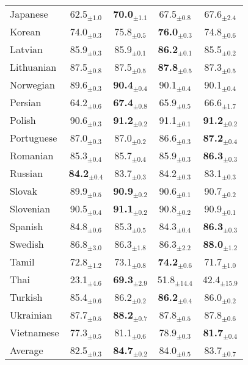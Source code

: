 \begin{table*}[ht]
{{\begin{tabular}{lcccc}
Japanese & 62.5$_{\pm 1.0}$ & \textbf{70.0}$_{\pm 1.1}$ & 67.5$_{\pm 0.8}$ & 67.6$_{\pm 2.4}$ \\
Korean & 74.0$_{\pm 0.3}$ & 75.8$_{\pm 0.5}$ & \textbf{76.0}$_{\pm 0.3}$ & 74.8$_{\pm 0.6}$ \\
Latvian & 85.9$_{\pm 0.3}$ & 85.9$_{\pm 0.1}$ & \textbf{86.2}$_{\pm 0.1}$ & 85.5$_{\pm 0.2}$ \\
Lithuanian & 87.5$_{\pm 0.8}$ & 87.5$_{\pm 0.5}$ & \textbf{87.8}$_{\pm 0.5}$ & 87.3$_{\pm 0.5}$ \\
Norwegian & 89.6$_{\pm 0.3}$ & \textbf{90.4}$_{\pm 0.4}$ & 90.1$_{\pm 0.4}$ & 90.1$_{\pm 0.4}$ \\
Persian & 64.2$_{\pm 0.6}$ & \textbf{67.4}$_{\pm 0.8}$ & 65.9$_{\pm 0.5}$ & 66.6$_{\pm 1.7}$ \\
Polish & 90.6$_{\pm 0.3}$ & \textbf{91.2}$_{\pm 0.2}$ & 91.1$_{\pm 0.1}$ & \textbf{91.2}$_{\pm 0.2}$ \\
Portuguese & 87.0$_{\pm 0.3}$ & 87.0$_{\pm 0.2}$ & 86.6$_{\pm 0.3}$ & \textbf{87.2}$_{\pm 0.4}$ \\
Romanian & 85.3$_{\pm 0.4}$ & 85.7$_{\pm 0.4}$ & 85.9$_{\pm 0.3}$ & \textbf{86.3}$_{\pm 0.3}$ \\
Russian & \textbf{84.2}$_{\pm 0.4}$ & 83.7$_{\pm 0.3}$ & 84.2$_{\pm 0.3}$ & 83.1$_{\pm 0.3}$ \\
Slovak & 89.9$_{\pm 0.5}$ & \textbf{90.9}$_{\pm 0.2}$ & 90.6$_{\pm 0.1}$ & 90.7$_{\pm 0.2}$ \\
Slovenian & 90.5$_{\pm 0.4}$ & \textbf{91.1}$_{\pm 0.2}$ & 90.8$_{\pm 0.2}$ & 90.9$_{\pm 0.1}$ \\
Spanish & 84.8$_{\pm 0.6}$ & 85.3$_{\pm 0.5}$ & 84.3$_{\pm 0.4}$ & \textbf{86.3}$_{\pm 0.3}$ \\
Swedish & 86.8$_{\pm 3.0}$ & 86.3$_{\pm 1.8}$ & 86.3$_{\pm 2.2}$ & \textbf{88.0}$_{\pm 1.2}$ \\
Tamil & 72.8$_{\pm 1.2}$ & 73.1$_{\pm 0.8}$ & \textbf{74.2}$_{\pm 0.6}$ & 71.7$_{\pm 1.0}$ \\
Thai & 23.1$_{\pm 4.6}$ & \textbf{69.3}$_{\pm 2.9}$ & 51.8$_{\pm 14.4}$ & 42.4$_{\pm 15.9}$ \\
Turkish & 85.4$_{\pm 0.6}$ & 86.2$_{\pm 0.2}$ & \textbf{86.2}$_{\pm 0.4}$ & 86.0$_{\pm 0.2}$ \\
Ukrainian & 87.7$_{\pm 0.5}$ & \textbf{88.2}$_{\pm 0.7}$ & 87.8$_{\pm 0.5}$ & 87.8$_{\pm 0.6}$ \\
Vietnamese & 77.3$_{\pm 0.5}$ & 81.1$_{\pm 0.6}$ & 78.9$_{\pm 0.3}$ & \textbf{81.7}$_{\pm 0.4}$ \\
\hline
Average & 82.5$_{\pm 0.3}$ & \textbf{84.7}$_{\pm 0.2}$ & 84.0$_{\pm 0.5}$ & 83.7$_{\pm 0.7}$ \\
        \hline
        \end{tabular}
        }
        \caption{}
        \label{table:results_distilmBERT_NER_before}
    }
        \end{table*}